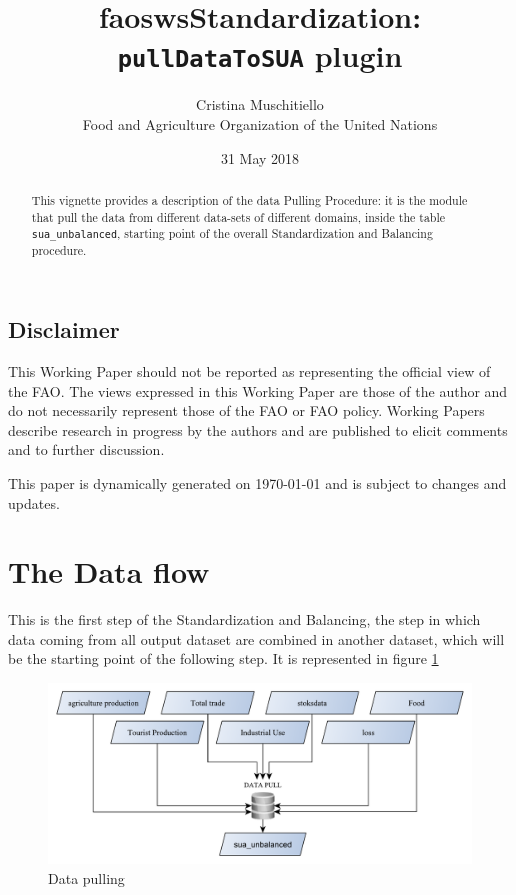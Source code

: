 \documentclass[]{article}
\title{faoswsStandardization:\\
\texttt{pullDataToSUA} plugin}
\author{Cristina Muschitiello\\
Food and Agriculture Organization of the United Nations}
\date{31 May 2018}
\begin{document}
\maketitle
\begin{abstract}
This vignette provides a description of the data Pulling Procedure: it
is the module that pull the data from different data-sets of different
domains, inside the table \texttt{sua\_unbalanced}, starting point of
the overall Standardization and Balancing procedure.
\end{abstract}

{
\setcounter{tocdepth}{4}
\tableofcontents
}
\newpage

\listoffigures

\subsection*{Disclaimer}\label{disclaimer}

This Working Paper should not be reported as representing the official
view of the FAO. The views expressed in this Working Paper are those of
the author and do not necessarily represent those of the FAO or FAO
policy. Working Papers describe research in progress by the authors and
are published to elicit comments and to further discussion.

This paper is dynamically generated on \today{} and is subject to
changes and updates.

\newpage

\section*{The Data flow}\label{the-data-flow}

This is the first step of the Standardization and Balancing, the step in
which data coming from all output dataset are combined in another
dataset, which will be the starting point of the following step. It is
represented in figure \ref{fig:f1}

\begin{figure}[H]

{\centering \includegraphics[width=1\linewidth]{images/pullData/01_pulldata} 

}

\caption{\label{fig:f1}Data pulling}\label{fig:f1}
\end{figure}
\end{document}
